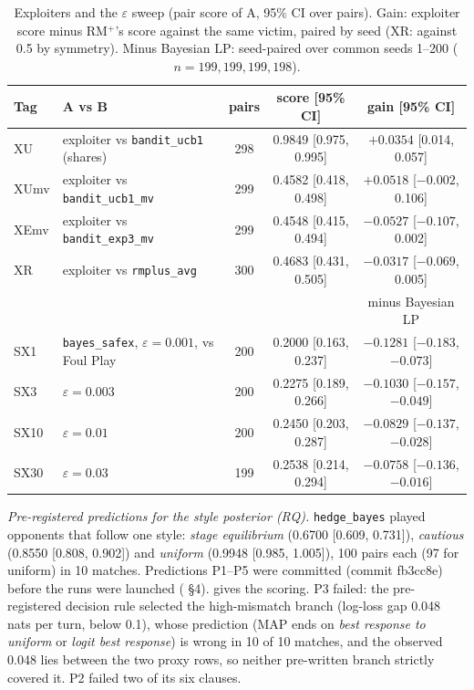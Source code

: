 \documentclass[10pt]{article}
\theoremstyle{plain}
\theoremstyle{definition}
\theoremstyle{remark}
\newcommand{\src}[1]{\path{#1}}
\begin{document}
\begin{table}[!htbp]\centering\small
\caption{Exploiters and the $\varepsilon$ sweep (pair score of A, 95\% CI over pairs). Gain: exploiter score minus RM$^+$'s
score against the same victim, paired by seed (XR: against 0.5 by symmetry). Minus Bayesian LP: seed-paired over common seeds 1--200 ($n=199,199,199,198$).}\label{tab:openitems}
\begin{tabular}{@{}llccc@{}}\toprule
Tag & A vs B & pairs & score [95\% CI] & gain [95\% CI] \\ \midrule
XU & exploiter vs \texttt{bandit\_ucb1} (shares) & 298 & 0.9849 [0.975, 0.995] & $+0.0354$ [0.014, 0.057] \\
XUmv & exploiter vs \texttt{bandit\_ucb1\_mv} & 299 & 0.4582 [0.418, 0.498] & $+0.0518$ [$-0.002$, 0.106] \\
XEmv & exploiter vs \texttt{bandit\_exp3\_mv} & 299 & 0.4548 [0.415, 0.494] & $-0.0527$ [$-0.107$, 0.002] \\
XR & exploiter vs \texttt{rmplus\_avg} & 300 & 0.4683 [0.431, 0.505] & $-0.0317$ [$-0.069$, 0.005] \\ \midrule
 & & & & minus Bayesian LP \\
SX1 & \texttt{bayes\_safex}, $\varepsilon=0.001$, vs Foul Play & 200 & 0.2000 [0.163, 0.237] & $-0.1281$ [$-0.183$, $-0.073$] \\
SX3 & $\varepsilon=0.003$ & 200 & 0.2275 [0.189, 0.266] & $-0.1030$ [$-0.157$, $-0.049$] \\
SX10 & $\varepsilon=0.01$ & 200 & 0.2450 [0.203, 0.287] & $-0.0829$ [$-0.137$, $-0.028$] \\
SX30 & $\varepsilon=0.03$ & 199 & 0.2538 [0.214, 0.294] & $-0.0758$ [$-0.136$, $-0.016$] \\ \bottomrule
\end{tabular}\end{table}

\emph{Pre-registered predictions for the style posterior (RQ).} \texttt{hedge\_bayes} played opponents that follow one
style: \emph{stage equilibrium} (0.6700 [0.609, 0.731]), \emph{cautious} (0.8550 [0.808, 0.902]) and \emph{uniform} (0.9948 [0.985, 1.005]),
100 pairs each (97 for uniform) in 10 matches. Predictions P1--P5 were committed (commit fb3cc8e) before the runs were launched
(\src{theory/tightening/bayes_dynamics.md} \S4).  gives the scoring. P3 failed: the pre-registered decision
rule selected the high-mismatch branch (log-loss gap 0.048 nats per turn, below 0.1), whose prediction (MAP ends on
\emph{best response to uniform} or \emph{logit best response}) is wrong in 10 of 10 matches, and the observed 0.048 lies between the two proxy rows, so
neither pre-written branch strictly covered it. P2 failed two of its six clauses.
\end{document}
